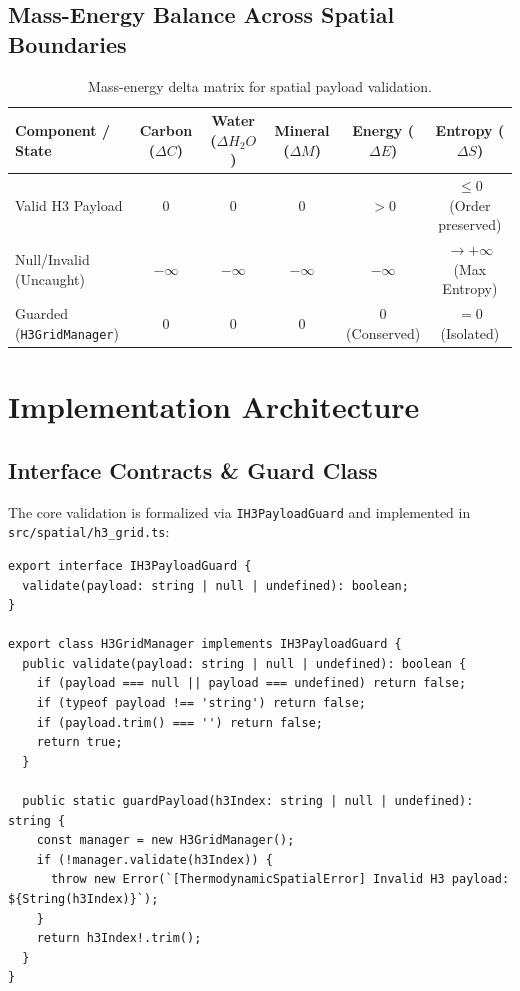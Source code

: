 \documentclass[11pt, a4paper]{article}
\begin{document}
\subsection{Mass-Energy Balance Across Spatial Boundaries}
\begin{table}[htbp]
\centering
\begin{tabular}{lccccc}
\toprule
\textbf{Component / State} & \textbf{Carbon ($\Delta C$)} & \textbf{Water ($\Delta H_2O$)} & \textbf{Mineral ($\Delta M$)} & \textbf{Energy ($\Delta E$)} & \textbf{Entropy ($\Delta S$)} \\
\midrule
Valid H3 Payload & $0$ & $0$ & $0$ & $>0$ & $\le 0$ (Order preserved) \\
Null/Invalid (Uncaught) & $-\infty$ & $-\infty$ & $-\infty$ & $-\infty$ & $\to +\infty$ (Max Entropy) \\
Guarded (\texttt{H3GridManager}) & $0$ & $0$ & $0$ & $0$ (Conserved) & $= 0$ (Isolated) \\
\bottomrule
\end{tabular}
\caption{Mass-energy delta matrix for spatial payload validation.}
\label{tab:mass_energy}
\end{table}

\section{Implementation Architecture}

\subsection{Interface Contracts \& Guard Class}
The core validation is formalized via \texttt{IH3PayloadGuard} and implemented in \texttt{src/spatial/h3\_grid.ts}:
\begin{verbatim}
export interface IH3PayloadGuard {
  validate(payload: string | null | undefined): boolean;
}

export class H3GridManager implements IH3PayloadGuard {
  public validate(payload: string | null | undefined): boolean {
    if (payload === null || payload === undefined) return false;
    if (typeof payload !== 'string') return false;
    if (payload.trim() === '') return false;
    return true;
  }

  public static guardPayload(h3Index: string | null | undefined): string {
    const manager = new H3GridManager();
    if (!manager.validate(h3Index)) {
      throw new Error(`[ThermodynamicSpatialError] Invalid H3 payload: ${String(h3Index)}`);
    }
    return h3Index!.trim();
  }
}
\end{verbatim}
\end{document}
